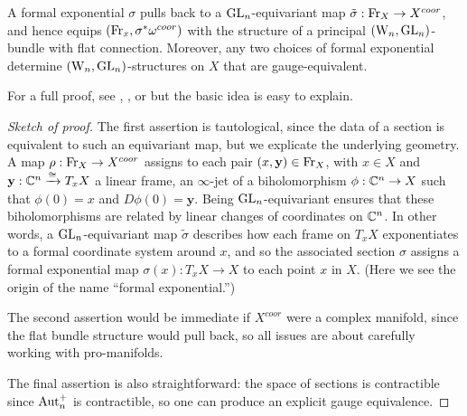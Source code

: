 % 

\begin{prop} \label{gauge equiv}
A formal exponential $\sigma$ pulls back to a ${\rm GL}_n$-equivariant map $\tilde{\sigma} : {\rm Fr}_X \to X^{coor}$,
and hence equips $({\rm Fr}_x, \sigma^* \omega^{coor})$ with the structure
of a principal $({{\rm W}_n},{\rm GL}_n)$-bundle with flat connection.
Moreover, any two choices of formal exponential determine $({{\rm W}_n},{\rm GL}_n)$-structures on $X$ that are gauge-equivalent. 
\end{prop}

For a full proof, see \cite{NT}, \cite{nest1995}, or \cite{khors} but the basic idea is easy to explain.

\begin{proof}[Sketch of proof]
The first assertion is tautological, since the data of a section is equivalent to such an equivariant map, but we explicate the underlying geometry.
A map $\rho : {\rm Fr}_X \to X^{coor}$ assigns to each pair  $(x, \mathbf{y}) \in {\rm Fr}_X$,
with $x \in X$ and $\mathbf{y} : \mathbb C^n \xrightarrow{\cong} T_x X$ a linear frame,
an $\infty$-jet of a biholomorphism $\phi: \mathbb C^n \to X$ such that $\phi(0) = x$ and $D\phi(0) = \mathbf{y}$.
Being ${\rm GL}_n$-equivariant ensures that these biholomorphisms are related by linear changes of coordinates on $\mathbb C^n$.
In other words, a ${\rm GL}_n$-equivariant map $\tilde{\sigma}$ describes how each frame on $T_x X$ exponentiates to a formal coordinate system around $x$,
and so the associated section $\sigma$ assigns a formal exponential map $\sigma(x) \colon T_x X \to X$ to each point $x$ in $X$.
(Here we see the origin of the name ``formal exponential.'')

The second assertion would be immediate if $X^{coor}$ were a complex manifold, since the flat bundle structure would pull back,
so all issues are about carefully working with pro-manifolds.

The final assertion is also straightforward: the space of sections is contractible since ${\rm Aut}_n^+$ is contractible, 
so one can produce an explicit gauge equivalence.
\end{proof}

